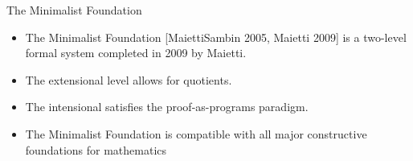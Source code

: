\documentclass{beamer}
\begin{document}
\begin{frame}
	\begin{block}{The Minimalist Foundation}
	\begin{itemize}
			\item {The Minimalist Foundation [MaiettiSambin 2005, Maietti 2009] is a two-level formal system completed in 2009 by Maietti.}
			\item {The extensional level allows for quotients.} 
			\item {The intensional satisfies the proof-as-programs paradigm.}
			\item{The Minimalist Foundation is compatible with all major constructive foundations for mathematics}
		\end{itemize}
	\end{block}
\vspace{0.5em}

\end{frame}
\end{document}
